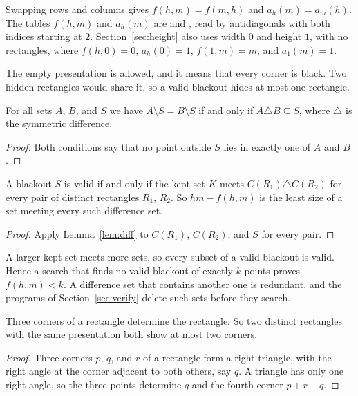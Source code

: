 Swapping rows and columns gives $f(h,m)=f(m,h)$ and $a_h(m)=a_m(h)$. The tables
$f(h,m)$ and $a_h(m)$ are  and , read by antidiagonals
with both indices starting at $2$. Section~\ref{sec:height} also uses width $0$ and height $1$, with no
rectangles, where $f(h,0)=0$, $a_h(0)=1$, $f(1,m)=m$, and $a_1(m)=1$.

\begin{remark}\label{rem:empty}
The empty presentation is allowed, and it means that every corner is black. Two hidden
rectangles would share it, so a valid blackout hides at most one rectangle.
\end{remark}

\begin{lemma}\label{lem:diff}
For all sets $A$, $B$, and $S$ we have $A\setminus S=B\setminus S$ if and only if
$A\triangle B\subseteq S$, where $\triangle$ is the symmetric difference.
\end{lemma}

\begin{proof}
Both conditions say that no point outside $S$ lies in exactly one of $A$ and $B$.
\end{proof}

\begin{corollary}\label{cor:hitting}
A blackout $S$ is valid if and only if the kept set $K$ meets
$C(R_1)\triangle C(R_2)$ for every pair of distinct rectangles $R_1$, $R_2$. So
$hm-f(h,m)$ is the least size of a set meeting every such difference set.
\end{corollary}

\begin{proof}
Apply Lemma~\ref{lem:diff} to $C(R_1)$, $C(R_2)$, and $S$ for every pair.
\end{proof}

A larger kept set meets more sets, so every subset of a valid blackout is valid. Hence a
search that finds no valid blackout of exactly $k$ points proves $f(h,m)<k$. A
difference set that contains another one is redundant, and the programs of
Section~\ref{sec:verify} delete such sets before they search.


\begin{lemma}\label{lem:threecorners}
Three corners of a rectangle determine the rectangle. So two distinct rectangles with
the same presentation both show at most two corners.
\end{lemma}

\begin{proof}
Three corners $p$, $q$, and $r$ of a rectangle form a right triangle, with the right
angle at the corner adjacent to both others, say $q$. A triangle has only one right
angle, so the three points determine $q$ and the fourth corner $p+r-q$.
\end{proof}
